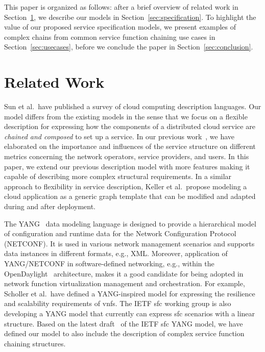 \documentclass{sig-alternate-per}
\begin{document}
This paper is organized as follows: after a brief overview of related work in
Section~\ref{sec:relatedwork}, we describe our models in Section~\ref{sec:specification}.
To highlight the value of our proposed service specification models, we present 
examples of complex chains from common service function chaining use cases in
Section~\ref{sec:usecases}, before we conclude the paper in Section~\ref{sec:conclusion}.




\section{Related Work}
\label{sec:relatedwork}

Sun et al.\,\cite{sun2012survey} have published a survey of cloud computing description
languages. Our model differs 
from the existing models in the sense that we focus on a flexible description
for expressing how the components of a distributed cloud service are \emph{chained and 
composed} to set up a service. In our previous work~\cite{mehraghdam2014specifying},
we have elaborated on the importance and influences of the service structure on 
different metrics concerning the network operators, service providers, and users.
In this paper, we extend our previous description model with more features making
it capable of describing more complex structural requirements. In a similar 
approach to flexibility in service description, Keller et al.\,\cite{Keller2014b} propose modeling 
a cloud application as a generic graph template that can be modified
and adapted during and after deployment.




The YANG~\cite{rfc6020} data modeling language is 
designed to provide a hierarchical model of configuration and runtime data for the 
Network Configuration Protocol (NETCONF). It is used in various network 
management scenarios and supports data instances in different formats, e.g., XML.
Moreover, application of YANG/NETCONF in software-defined networking,
e.g., within the OpenDaylight~\cite{medved2014opendaylight} architecture, makes it 
a good candidate for being adopted in network function virtualization
management and orchestration. For example, Scholler et al.\,\cite{scholler2013resilient} have 
defined a YANG-inspired model for expressing the resilience and scalability
requirements of \acp{vnf}.
The IETF \ac{sfc} working group is also developing a 
YANG model that currently can express \ac{sfc} scenarios with a linear structure.
Based on the latest draft~\cite{draft-penno-sfc-yang-11} of the IETF \ac{sfc} YANG model,
we have defined our model to also include the description of complex service function
chaining structures. 
\end{document}
